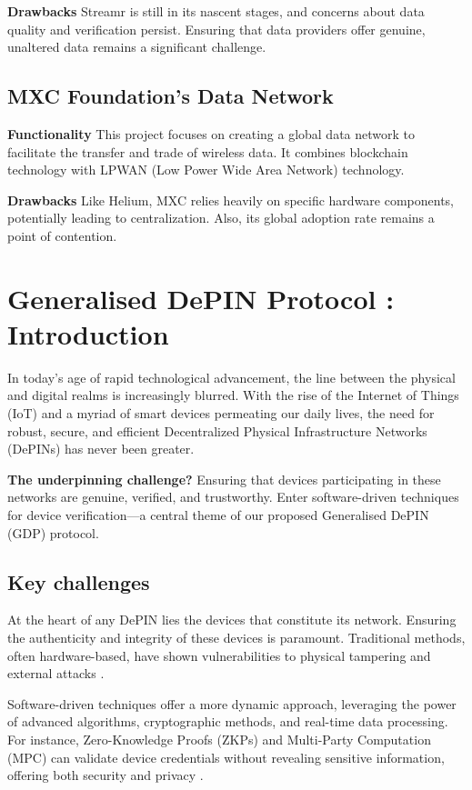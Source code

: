 \documentclass{article}
\begin{document}
\textbf{Drawbacks} Streamr is still in its nascent stages, and concerns about data quality and verification persist. Ensuring that data providers offer genuine, unaltered data remains a significant challenge.

\subsection{MXC Foundation's Data Network}
\textbf{Functionality} This project focuses on creating a global data network to facilitate the transfer and trade of wireless data. It combines blockchain technology with LPWAN (Low Power Wide Area Network) technology.

\textbf{Drawbacks} Like Helium, MXC \cite{werner2019mxc} relies heavily on specific hardware components, potentially leading to centralization. Also, its global adoption rate remains a point of contention.

\section{Generalised DePIN Protocol : Introduction}

In today's age of rapid technological advancement, the line between the physical and digital realms is increasingly blurred. With the rise of the Internet of Things (IoT) and a myriad of smart devices permeating our daily lives, the need for robust, secure, and efficient Decentralized Physical Infrastructure Networks (DePINs) has never been greater. 

\textbf{The underpinning challenge? }Ensuring that devices participating in these networks are genuine, verified, and trustworthy. Enter software-driven techniques for device verification—a central theme of our proposed Generalised DePIN (GDP) protocol.

\subsection{Key challenges}
At the heart of any DePIN lies the devices that constitute its network. Ensuring the authenticity and integrity of these devices is paramount. Traditional methods, often hardware-based, have shown vulnerabilities to physical tampering and external attacks \cite{chen2017hardware}. 

Software-driven techniques offer a more dynamic approach, leveraging the power of advanced algorithms, cryptographic methods, and real-time data processing. For instance, Zero-Knowledge Proofs (ZKPs) and Multi-Party Computation (MPC) can validate device credentials without revealing sensitive information, offering both security and privacy \cite{goldwasser1989knowledge}.
\end{document}
